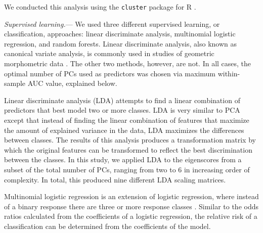 \documentclass[12pt,letterpaper]{article}
\renewcommand{\subsubsection}[1]{%
\vspace{2ex}
\noindent
\textit{#1.}---}
\begin{document}

We conducted this analysis using the \texttt{cluster} package for R \citep{Maechler2013}.

\subsubsection{Supervised learning}
We used three different supervised learning, or classification, approaches: linear discriminate analysis, multinomial logistic regression, and random forests. Linear discriminate analysis, also known as canonical variate analysis, is commonly used in studies of geometric morphometric data \citep{Zelditch2004,Mitteroecker2011}. The other two methods, however, are not. In all cases, the optimal number of PCs used as predictors was chosen via maximum within-sample AUC value, explained below.

Linear discriminate analysis (LDA) attempts to find a linear combination of predictors that best model two or more classes. LDA is very similar to PCA except that instead of finding the linear combination of features that maximize the amount of explained variance in the data, LDA maximizes the differences between classes. The results of this analysis produces a transformation matrix by which the original features can be transformed to reflect the best discrimination between the classes. In this study, we applied LDA to the eigenscores from a subset of the total number of PCs, ranging from two to 6 in increasing order of complexity. In total, this produced nine different LDA scaling matrices. 

Multinomial logistic regression is an extension of logistic regression, where instead of a binary response there are three or more response classes \citep{Venables2002a}. Similar to the odds ratios calculated from the coefficients of a logistic regression, the relative risk of a classification can be determined from the coefficients of the model.
\end{document}
